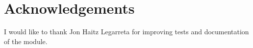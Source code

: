 \section{Acknowledgements}
\label{sec:Acknow}
I would like to thank Jon Haitz Legarreta for improving tests and documentation of the module.

%

%
%
% 
